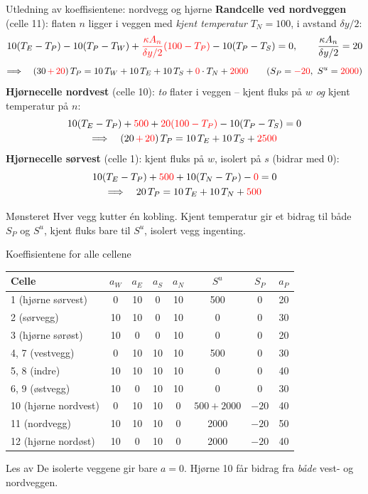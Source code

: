 \documentclass[11pt,aspectratio=169]{beamer}
\begin{document}
\begin{frame}{Utledning av koeffisientene: nordvegg og hjørne}
\footnotesize
\textbf{Randcelle ved nordveggen} (celle 11): flaten $n$ ligger i veggen med \emph{kjent temperatur} $T_N = 100$, i avstand $\delta y/2$:
\[
10(T_E - T_P) - 10(T_P - T_W) + {\color{red}\frac{\kappa A_n}{\delta y/2}(100 - T_P)} - 10(T_P - T_S) = 0, \qquad \frac{\kappa A_n}{\delta y/2} = 20
\]
\[
\Longrightarrow\quad (30 {\color{red}\,+\, 20})\,T_P = 10\,T_W + 10\,T_E + 10\,T_S + {\color{red}0}\cdot T_N + {\color{red}2000}
\qquad (S_P = {\color{red}-20},\ S^u = {\color{red}2000})
\]
\textbf{Hjørnecelle nordvest} (celle 10): \emph{to} flater i veggen -- kjent fluks på $w$ \emph{og} kjent temperatur på $n$:
\begin{gather*}
10(T_E - T_P) + {\color{red}500} + {\color{red}20(100 - T_P)} - 10(T_P - T_S) = 0
\\
\Longrightarrow\quad (20 {\color{red}\,+\, 20})\,T_P = 10\,T_E + 10\,T_S + {\color{red}2500}
\end{gather*}
\textbf{Hjørnecelle sørvest} (celle 1): kjent fluks på $w$, isolert på $s$ (bidrar med $0$):
\begin{gather*}
10(T_E - T_P) + {\color{red}500} + 10(T_N - T_P) - {\color{red}0} = 0
\\
\Longrightarrow\quad 20\,T_P = 10\,T_E + 10\,T_N + {\color{red}500}
\end{gather*}
\begin{remb}{Mønsteret}
Hver vegg kutter én kobling. Kjent temperatur gir et bidrag til både $S_P$ og $S^u$, kjent fluks bare til $S^u$, isolert vegg ingenting.
\end{remb}
\end{frame}

\begin{frame}{Koeffisientene for alle cellene}
\centering\small
\begin{tabular}{lccccccc}
\toprule
Celle & $a_W$ & $a_E$ & $a_S$ & $a_N$ & $S^u$ & $S_P$ & $a_P$ \\
\midrule
1 (hjørne sørvest) & 0 & 10 & 0 & 10 & 500 & 0 & 20 \\
2 (sørvegg) & 10 & 10 & 0 & 10 & 0 & 0 & 30 \\
3 (hjørne sørøst) & 10 & 0 & 0 & 10 & 0 & 0 & 20 \\
4, 7 (vestvegg) & 0 & 10 & 10 & 10 & 500 & 0 & 30 \\
5, 8 (indre) & 10 & 10 & 10 & 10 & 0 & 0 & 40 \\
6, 9 (østvegg) & 10 & 0 & 10 & 10 & 0 & 0 & 30 \\
10 (hjørne nordvest) & 0 & 10 & 10 & 0 & $500+2000$ & $-20$ & 40 \\
11 (nordvegg) & 10 & 10 & 10 & 0 & 2000 & $-20$ & 50 \\
12 (hjørne nordøst) & 10 & 0 & 10 & 0 & 2000 & $-20$ & 40 \\
\bottomrule
\end{tabular}
\begin{remb}{Les av}
De isolerte veggene gir bare $a=0$. Hjørne 10 får bidrag fra \emph{både} vest- og nordveggen.
\end{remb}
\end{frame}
\end{document}
